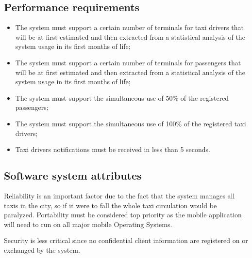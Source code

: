 \subsection{Performance requirements}
\begin{itemize}

\item The system must support a certain number of terminals for taxi drivers that will be at first estimated and then extracted from a statistical analysis of the system usage in its first months of life;
\item The system must support a certain number of terminals for passengers that will be at first estimated and then extracted from a statistical analysis of the system usage in its first months of life;
\item The system must support the simultaneous use of 50\% of the registered passengers;
\item The system must support the simultaneous use of 100\% of the registered taxi drivers;
\item Taxi drivers notifications must be received in less than 5 seconds.

\end{itemize}

\subsection{Software system attributes}
Reliability is an important factor due to the fact that the system manages all taxis in the city, so if it were to fall the whole taxi circulation would be paralyzed. Portability must be considered top priority as the mobile application will need to run on all major mobile Operating Systems.

Security is less critical since no confidential client information are registered on or exchanged by the system.

